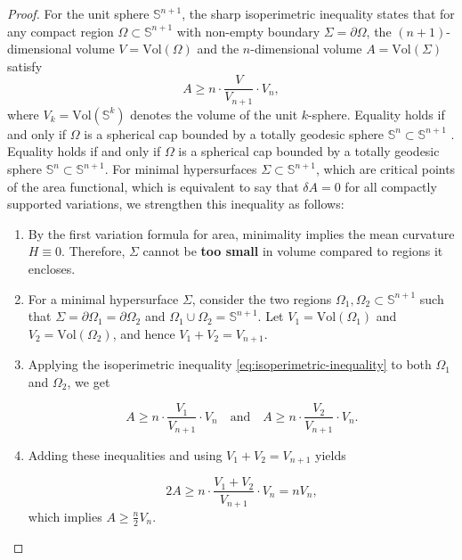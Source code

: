 \documentclass[a4, 12pt]{amsart}
\numberwithin{equation}{section} \numberwithin{equation}{section}
\begin{document}
\begin{proof}
For the unit sphere \(\mathbb{S}^{n+1}\), the sharp isoperimetric inequality states \cite[Theorem 2.1]{Ros2005} that for any compact region \(\Omega \subset \mathbb{S}^{n+1}\) with non-empty boundary \(\Sigma = \partial \Omega\), the \((n+1)\)-dimensional volume \(V = \text{Vol}(\Omega)\) and the \(n\)-dimensional volume \(A = \text{Vol}(\Sigma)\) satisfy
\[
A \geq n \cdot \frac{V}{V_{n+1}} \cdot V_n,
\]
where \(V_k = \text{Vol}(\mathbb{S}^k)\) denotes the volume of the unit \(k\)-sphere. Equality holds if and only if \(\Omega\) is a spherical cap bounded by a totally geodesic sphere \(\mathbb{S}^n \subset \mathbb{S}^{n+1}\) \cite[Corollary 3.2]{BuragoZalgaller1988}. Equality holds if and only if $\Omega$ is a spherical cap bounded by a totally geodesic sphere $\mathbb{S}^n \subset \mathbb{S}^{n+1}$.
For minimal hypersurfaces $\Sigma \subset \mathbb{S}^{n+1}$, which are critical points of the area functional, which is equivalent to say that $\delta A = 0$ for all compactly supported variations, we strengthen this inequality as follows:
\begin{enumerate}
    \item[(i)] By the first variation formula for area, minimality implies the mean curvature $H \equiv 0$. Therefore, $\Sigma$ cannot be \textbf{too small} in volume compared to regions it encloses.
    \item[(ii)] For a minimal hypersurface $\Sigma$, consider the two regions $\Omega_1, \Omega_2 \subset \mathbb{S}^{n+1}$ such that $\Sigma = \partial \Omega_1 = \partial \Omega_2$ and $\Omega_1 \cup \Omega_2 = \mathbb{S}^{n+1}$. Let $V_1 = \text{Vol}(\Omega_1)$ and $V_2 = \text{Vol}(\Omega_2)$, and hence $V_1 + V_2 = V_{n+1}$.
       \item[(iii)] Applying the isoperimetric inequality \eqref{eq:isoperimetric-inequality} to both $\Omega_1$ and $\Omega_2$, we get

    \begin{equation}\label{eq:isoperimetric-inequality}
    A \geq n \cdot \frac{V_1}{V_{n+1}} \cdot V_n \quad \text{and} \quad A \geq n \cdot \frac{V_2}{V_{n+1}} \cdot V_n.
    \end{equation}

    \item[(iv)] Adding these inequalities and using $V_1 + V_2 = V_{n+1}$ yields

    \[
    2A \geq n \cdot \frac{V_1 + V_2}{V_{n+1}} \cdot V_n = n V_n,
    \]
     which implies $A \geq \frac{n}{2} V_n$.
\end{enumerate}


\end{proof}
\end{document}
